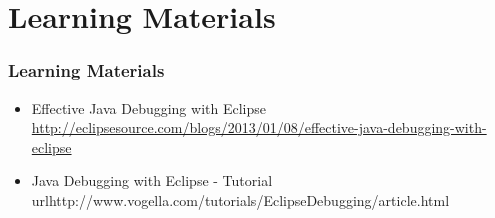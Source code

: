 \documentclass{beamer}
\begin{document}
\section{Learning Materials}
\begin{frame}[fragile]
\frametitle{Learning Materials}
\begin{itemize}
\item Effective Java Debugging with Eclipse\\\url{http://eclipsesource.com/blogs/2013/01/08/effective-java-debugging-with-eclipse}
\item Java Debugging with Eclipse - Tutorial\\url{http://www.vogella.com/tutorials/EclipseDebugging/article.html}
\end{itemize}
\end{frame}
\end{document}
